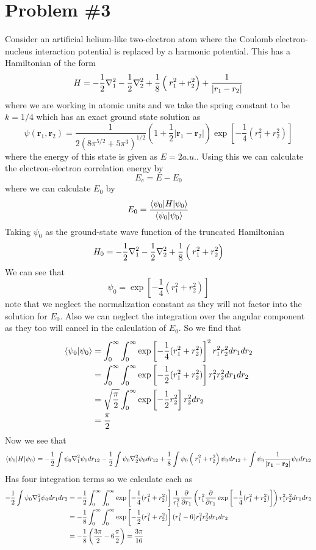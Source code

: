 \documentclass[11pt]{article}
\numberwithin{equation}{section}
\begin{document}
\pagebreak

\section{Problem \#3}
Consider an artificial helium-like two-electron atom where the Coulomb electron-nucleus 
interaction potential is replaced by a harmonic potential. This has a Hamiltonian of the 
form
$$H = -\frac{1}{2}\bold\nabla_1^2-\frac{1}{2}\bold\nabla_2^2+\frac{1}{8}\left(\frac{}{}r_1^2+r_2^2\right) + \frac{1}{|r_1-r_2|}$$
where we are working in atomic units and we take the spring constant to be $k=1/4$ which has
an exact ground state solution as
$$\psi(\mathbf{r}_1,\mathbf{r}_2) = \frac{1}{2(8\pi^{5/2}+5\pi^3)^{1/2}}\left(1+\frac{1}{2}|\mathbf{r}_1-\mathbf{r}_2|\right)\exp\left[-\frac{1}{4}(r_1^2+r_2^2)\right]$$
where the energy of this state is given as $E=2\unit{a.u.}$. Using this we can calculate the
electron-electron correlation energy by
$$E_c = E - E_0$$
where we can calculate $E_0$ by 
$$E_0 = \frac{\langle{\psi_0}|H|{\psi_0}\rangle}{\langle{\psi_0}|{\psi_0}\rangle}$$
Taking $\psi_0$ as the ground-state wave function of the truncated Hamiltonian
$$H_0 = -\frac{1}{2}\bold\nabla_1^2-\frac{1}{2}\bold\nabla_2^2+\frac{1}{8}\left(\frac{}{}r_1^2+r_2^2\right)$$
We can see that 
$$\psi_0 = \exp\left[-\frac{1}{4}(r_1^2+r_2^2)\right]$$
note that we neglect the normalization constant as they will not factor into the solution for 
$E_0$. Also we can neglect the integration over the angular component as they too will cancel
in the calculation of $E_0$. So we find that
\begin{align*}
\langle{\psi_0}|{\psi_0}\rangle &= \int_{0}^{\infty}\int_{0}^{\infty}\exp\left[-\frac{1}{4}(r_1^2+r_2^2)\right]^2r_1^2r_2^2dr_1dr_2\\
&= \int_{0}^{\infty}\int_{0}^{\infty}\exp\left[-\frac{1}{2}(r_1^2+r_2^2)\right]r_1^2r_2^2dr_1dr_2\\
&= \sqrt{\frac{\pi}{2}}\int_{0}^{\infty}\exp\left[-\frac{1}{2}r_2^2\right]r_2^2dr_2\\
&= \frac{\pi}{2}
\end{align*}
Now we see that 
\begin{align*}
\langle{\psi_0}|H|{\psi_0}\rangle &= -\frac{1}{2}\int\psi_0\bold\nabla^2_1\psi_0dr_{12}
-\frac{1}{2}\int\psi_0\bold\nabla^2_2\psi_0dr_{12}
+ \frac{1}{8}\int\psi_0\left(\frac{}{}r_1^2+r_2^2\right)\psi_0dr_{12}
+ \int\psi_0\frac{1}{|\mathbf{r_1}-\mathbf{r_2}|}\psi_0dr_{12}\\
\end{align*}
Has four integration terms so we calculate each as
\begin{align*}
-\frac{1}{2}\int\psi_0\bold\nabla^2_1\psi_0dr_1dr_2 &= -\frac{1}{2}\int_{0}^{\infty}\int_{0}^{\infty}\exp\left[-\frac{1}{4}(r_1^2+r_2^2)\right]\frac{1}{r_1^2}\frac{\partial{}}{\partial{r_1}}\left(r_1^2\frac{\partial{}}{\partial{r_1}}\exp\left[-\frac{1}{4}(r_1^2+r_2^2)\right]\right)r_1^2r_2^2dr_1dr_2\\
&= -\frac{1}{8}\int_{0}^{\infty}\int_{0}^{\infty}\exp\left[-\frac{1}{2}(r_1^2+r_2^2)\right](r_1^2-6)r_1^2r_2^2dr_1dr_2\\
&= -\frac{1}{8}\left(\frac{3\pi}{2} - 6\frac{\pi}{2}\right) = \frac{3\pi}{16}
\end{align*}
\end{document}
